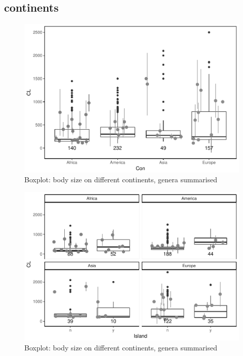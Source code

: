 \documentclass[]{article}
\begin{document}
\newpage

\subsection{continents}\label{continents-1}

\begin{figure}[htbp]
\centering
\includegraphics{MA_JJ_files/figure-latex/Boxplot body size split into continents-1.pdf}
\caption{Boxplot: body size on different continents, genera summarised}
\end{figure}

\begin{figure}[htbp]
\centering
\includegraphics{MA_JJ_files/figure-latex/Boxplot body size split into continents, continental vs. insular-1.pdf}
\caption{Boxplot: body size on different continents, genera summarised}
\end{figure}
\end{document}

